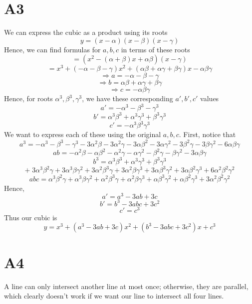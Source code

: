 \documentclass{book}
\begin{document}
\section*{A3}
We can express the cubic as a product using its roots
$$y = (x - \alpha)(x - \beta)(x - \gamma)$$
Hence, we can find formulas for $a, b, c$ in terms of these roots
$$= (x^2 - (\alpha + \beta)x + \alpha\beta)(x - \gamma)$$
$$= x^3 + (-\alpha - \beta - \gamma)x^2 + (\alpha\beta + \alpha\gamma + \beta\gamma)x - \alpha\beta\gamma$$
$$\Rightarrow a = -\alpha - \beta - \gamma$$
$$\Rightarrow b = \alpha\beta + \alpha\gamma + \beta\gamma$$
$$\Rightarrow c = -\alpha\beta\gamma$$
Hence, for roots $\alpha^3, \beta^3, \gamma^3$, we have these corresponding $a', b', c'$ values
$$a' = -\alpha^3 - \beta^3 - \gamma^3$$
$$b' = \alpha^3\beta^3 + \alpha^3\gamma^3 + \beta^3\gamma^3$$
$$c' = -\alpha^3\beta^3\gamma^3$$
We want to express each of these using the original $a, b, c$.
First, notice that
$$a^3 = -\alpha^3 - \beta^3 - \gamma^3 - 3\alpha^2\beta - 3\alpha^2\gamma - 3\alpha\beta^2 - 3\alpha\gamma^2 - 3\beta^2\gamma - 3\beta\gamma^2 - 6\alpha\beta\gamma$$
$$ab = -\alpha^2\beta - \alpha\beta^2 - \alpha^2\gamma - \alpha\gamma^2 - \beta^2\gamma - \beta\gamma^2 - 3\alpha\beta\gamma$$
$$b^3 = \alpha^3\beta^3 + \alpha^3\gamma^3 + \beta^3\gamma^3$$
$$+ \; 3\alpha^3\beta^2\gamma + 3\alpha^3\beta\gamma^2 + 3\alpha^2\beta^3\gamma + 3\alpha^2\beta\gamma^3 + 3\alpha\beta^3\gamma^2 + 3\alpha\beta^2\gamma^3 + 6\alpha^2\beta^2\gamma^2$$
$$abc = \alpha^3\beta^2\gamma + \alpha^3\beta\gamma^2 + \alpha^2\beta^3\gamma + \alpha^2\beta\gamma^3 + \alpha\beta^3\gamma^2 + \alpha\beta^2\gamma^3 + 3\alpha^2\beta^2\gamma^2$$
Hence,
$$a' = a^3 - 3ab + 3c$$
$$b' = b^3 - 3abc + 3c^2$$
$$c' = c^3$$
Thus our cubic is
$$y = x^3 + (a^3 - 3ab + 3c)x^2 + (b^3 - 3abc + 3c^2)x + c^3$$

\section*{A4}
A line can only intersect another line at most once; otherwise, they are parallel, which clearly doesn't work if we want our line to intersect all four lines.
\end{document}
